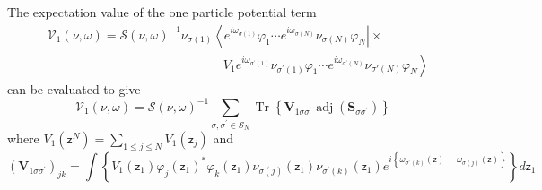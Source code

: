 \documentclass[aps,preprint]{revtex4}%
\begin{document}
The expectation value of the one particle potential term
\begin{align}
&  \mathcal{V}_{1}\left(  \nu,\omega\right)  =\mathcal{S}\left(  \nu
,\omega\right)  ^{-1}\nu_{\sigma\left(  1\right)  }\left\langle e^{i\omega
_{\sigma\left(  1\right)  }}\varphi_{1}\cdots e^{i\omega_{\sigma\left(
N\right)  }}\nu_{\sigma\left(  N\right)  }\varphi_{N}\right\vert
\times\nonumber\\
&  \qquad\qquad\qquad\qquad\qquad\qquad\qquad\left.  V_{1}e^{i\omega
_{\sigma^{\prime}\left(  1\right)  }}\nu_{\sigma^{\prime}\left(  1\right)
}\varphi_{1}\cdots e^{i\omega_{\sigma^{\prime}\left(  N\right)  }}\nu
_{\sigma\prime\left(  N\right)  }\varphi_{N}\right\rangle
\end{align}
can be evaluated to give
\begin{equation}
\mathcal{V}_{1}\left(  \nu,\omega\right)  =\mathcal{S}\left(  \nu
,\omega\right)  ^{-1}%
{\textstyle\sum\limits_{\sigma,\sigma^{\prime}\in\mathcal{S}_{N}}}
\operatorname{Tr}\left\{  \mathbf{V}_{1\sigma\sigma^{\prime}}%
\operatorname{adj}\left(  \mathbf{S}_{\sigma\sigma^{\prime}}\right)  \right\}
\end{equation}
where $V_{1}\left(  \mathsf{z}^{N}\right)  =%
{\displaystyle\sum\limits_{1\leq j\leq N}}
V_{1}\left(  \mathsf{z}_{j}\right)  $ and
\begin{equation}
\left(  \mathbf{V}_{1\sigma\sigma^{\prime}}\right)  _{jk}=\int\left\{
V_{1}\left(  \mathsf{z}_{1}\right)  \varphi_{j}\left(  \mathsf{z}_{1}\right)
^{\ast}\varphi_{k}\left(  \mathsf{z}_{1}\right)  \nu_{\sigma\left(  j\right)
}\left(  \mathsf{z}_{1}\right)  \nu_{\sigma^{\prime}\left(  k\right)  }\left(
\mathsf{z}_{1}\right)  e^{i\left\{  \omega_{\sigma^{\prime}\left(  k\right)
}\left(  \mathsf{z}\right)  -\,\omega_{\sigma\left(  j\right)  }\left(
\mathsf{z}\right)  \right\}  }\right\}  d\mathsf{z}_{1}%
\end{equation}
\end{document}
